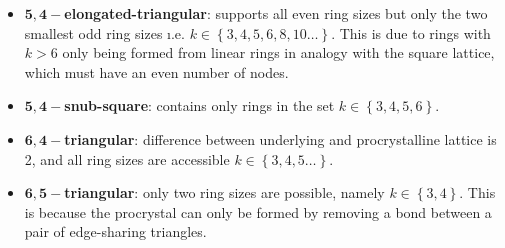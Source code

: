 \begin{itemize}
	
	\item $\mathbf{5,4-}$\textbf{elongated\--triangular}: supports all even ring sizes but only the two smallest odd ring sizes \i.e. $k\in\left\{3,4,5,6,8,10\dots\right\}$. This is due to rings with $k>6$ only being formed from linear rings in analogy with the square lattice, which must have an even number of nodes.
	\item $\mathbf{5,4-}$\textbf{snub\--square}: contains only rings in the set $k\in\left\{3,4,5,6\right\}$.
	\item $\mathbf{6,4-}$\textbf{triangular}: difference between underlying and procrystalline lattice is 2, and all ring sizes are accessible $k\in\left\{3,4,5\dots\right\}$.
	\item $\mathbf{6,5-}$\textbf{triangular}: only two ring sizes are possible, namely $k\in\left\{3,4\right\}$. This is because the procrystal can only be formed by removing a bond between a pair of edge\--sharing triangles.
	
\end{itemize}

